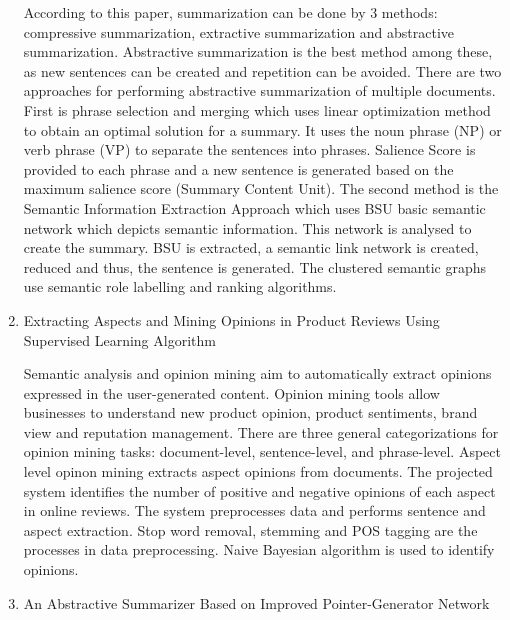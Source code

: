 \documentclass[11pt]{report}
\begin{document}
\begin{enumerate}
	According to this paper, summarization can be done by 3 methods: compressive summarization, extractive summarization and abstractive summarization. Abstractive summarization is the best method among these, as new sentences can be created and repetition can be avoided. There are two approaches for performing abstractive summarization of multiple documents. First is phrase selection and merging which uses linear optimization method to obtain an optimal solution for a summary. It uses the noun phrase (NP) or verb phrase (VP) to separate the sentences into phrases. Salience Score is provided to each phrase and a new sentence is generated based on the maximum salience score (Summary Content Unit). The second method is the Semantic Information Extraction Approach which uses BSU basic semantic network which depicts semantic information. This network is analysed to create the summary. BSU is extracted, a semantic link network is created, reduced and thus, the sentence is generated. The clustered semantic graphs use semantic role labelling and ranking algorithms.\\

    \item Extracting Aspects and Mining Opinions in Product Reviews Using Supervised Learning Algorithm\cite{5}

	Semantic analysis and opinion mining aim to automatically extract opinions expressed in the user-generated content. Opinion mining tools allow businesses to understand new product opinion, product sentiments, brand view and reputation management. There are three general categorizations for opinion mining tasks: document-level, sentence-level, and phrase-level. Aspect level opinon mining extracts aspect opinions from documents. The projected system identifies the number of positive and negative opinions of each aspect in online reviews. The system preprocesses data and performs sentence and aspect extraction. Stop word removal, stemming and POS tagging are the processes in data preprocessing. Naive Bayesian algorithm is used to identify opinions.\\

    \item An Abstractive Summarizer Based on Improved Pointer-Generator Network\cite{6}


\end{enumerate}
\end{document}

